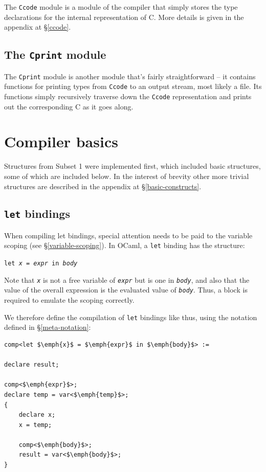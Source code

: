 \documentclass[12pt,a4paper,twoside,openright]{report}
\begin{document}
The \texttt{Ccode} module is a module of the compiler that simply stores the
type declarations for the internal representation of C. More details is given in
the appendix at \S\ref{ccode}.

\subsection{The \texttt{Cprint} module}

The \texttt{Cprint} module is another module that's fairly straightforward --
it contains functions for printing types from \texttt{Ccode} to an output
stream, most likely a file. Its functions simply recursively traverse down the
\texttt{Ccode} representation and prints out the corresponding C as it goes
along.

\section{Compiler basics}

Structures from Subset 1 were implemented first, which included basic
structures, some of which are included below. In the interest of brevity other
more trivial structures are described in the appendix at
\S\ref{basic-constructs}.

\subsection{\texttt{let} bindings}

When compiling let bindings, special attention needs to be paid to the variable
scoping (see \S\ref{variable-scoping}). In OCaml, a \texttt{let} binding has the
structure:

\begin{center}
    \texttt{let \emph{x} = \emph{expr} in \emph{body}}
\end{center}

Note that \texttt{\emph{x}} is not a free variable of \texttt{\emph{expr}} 
but is one in \texttt{\emph{body}}, and also that the value of the overall 
expression is the evaluated value of \texttt{\emph{body}}. Thus, a block is 
required to emulate the scoping correctly.

We therefore define the compilation of \texttt{let} bindings like thus, using
the notation defined in \S\ref{meta-notation}:

\begin{lstlisting}
comp<let $\emph{x}$ = $\emph{expr}$ in $\emph{body}$> :=

declare result;

comp<$\emph{expr}$>;
declare temp = var<$\emph{temp}$>;
{
    declare x;
    x = temp;
    
    comp<$\emph{body}$>;
    result = var<$\emph{body}$>;
}
\end{lstlisting}
\end{document}
